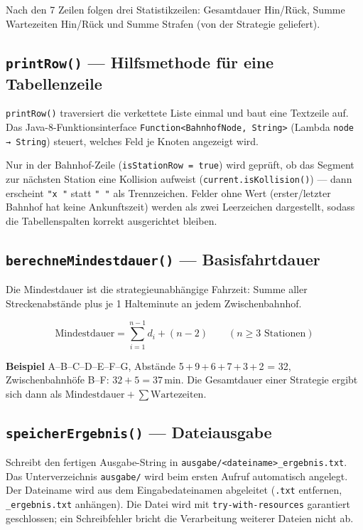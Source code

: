 \documentclass[12pt,a4paper]{article}
\begin{document}
Nach den 7 Zeilen folgen drei Statistikzeilen: Gesamtdauer Hin/Rück,
Summe Wartezeiten Hin/Rück und Summe Strafen (von der Strategie geliefert).

\subsection{\texttt{printRow()} — Hilfsmethode für eine Tabellenzeile}

\texttt{printRow()} traversiert die verkettete Liste einmal und baut
eine Textzeile auf. Das Java-8-Funktionsinterface
\texttt{Function\textless BahnhofNode,\,String\textgreater}
(Lambda \texttt{node → String}) steuert, welches Feld je Knoten angezeigt wird.

Nur in der Bahnhof-Zeile (\texttt{isStationRow = true}) wird geprüft,
ob das Segment zur nächsten Station eine Kollision aufweist
(\texttt{current.isKollision()}) — dann erscheint \texttt{"x "} statt
\texttt{"  "} als Trennzeichen.
Felder ohne Wert (erster/letzter Bahnhof hat keine Ankunftszeit) werden
als zwei Leerzeichen dargestellt, sodass die Tabellenspalten korrekt ausgerichtet bleiben.

\subsection{\texttt{berechneMindestdauer()} — Basisfahrtdauer}

Die Mindestdauer ist die strategieunabhängige Fahrzeit: Summe aller
Streckenabstände plus je 1 Halteminute an jedem Zwischenbahnhof.

\[
  \text{Mindestdauer} = \sum_{i=1}^{n-1} d_i + (n-2)
  \qquad (n \geq 3 \text{ Stationen})
\]

\textbf{Beispiel} A–B–C–D–E–F–G, Abstände 5\,+\,9\,+\,6\,+\,7\,+\,3\,+\,2 = 32,
Zwischenbahnhöfe B–F: $32 + 5 = 37$\,min.
Die Gesamtdauer einer Strategie ergibt sich dann als
$\text{Mindestdauer} + \sum\text{Wartezeiten}$.

\subsection{\texttt{speicherErgebnis()} — Dateiausgabe}

Schreibt den fertigen Ausgabe-String in
\texttt{ausgabe/\textless dateiname\textgreater\_ergebnis.txt}.
Das Unterverzeichnis \texttt{ausgabe/} wird beim ersten Aufruf automatisch angelegt.
Der Dateiname wird aus dem Eingabedateinamen abgeleitet (\texttt{.txt} entfernen,
\texttt{\_ergebnis.txt} anhängen).
Die Datei wird mit \texttt{try-with-resources} garantiert geschlossen;
ein Schreibfehler bricht die Verarbeitung weiterer Dateien nicht ab.
\end{document}
